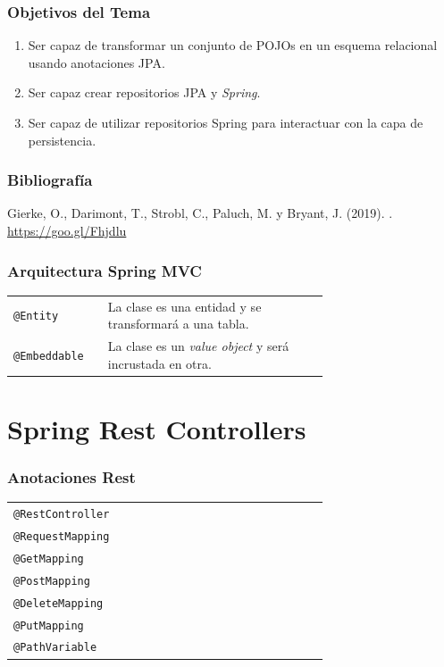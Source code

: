 \documentclass[handout,a4paper,slidestop,xcolor=pst,blue]{beamer}
\newcommand{\ann}[1]{\color{blue}\texttt{#1}\color{black}}
\begin{document}
\begin{frame}[c]
    \frametitle{Objetivos del Tema}
    \begin{enumerate}[<+->]
         \item Ser capaz de transformar un conjunto de POJOs en un esquema relacional usando anotaciones JPA.
         \item Ser capaz crear repositorios JPA y \emph{Spring}.
         \item Ser capaz de utilizar repositorios Spring para interactuar con la capa de persistencia.
    \end{enumerate}
\end{frame}

\begin{frame}[c]
    \frametitle{Bibliografía}
    \begin{thebibliography}{1}

        Gierke, O., Darimont, T., Strobl, C., Paluch, M. y Bryant, J. (2019).
        .
        \url{https://goo.gl/Fhjdlu}

    \end{thebibliography}
\end{frame}

\begin{frame}[c]
    \frametitle{Arquitectura Spring MVC}
    \begin{tabular}{lp{0.70\linewidth}}
        \ann{@Entity}     & La clase es una entidad y se transformará a una tabla. \\
        \ann{@Embeddable} & La clase es un \emph{value object} y será incrustada en otra.
    \end{tabular}
\end{frame}

\section{Spring Rest Controllers}

\begin{frame}[c]
    \frametitle{Anotaciones Rest}
    \begin{tabular}{lp{0.70\linewidth}}
        \ann{@RestController} &  \\
        \ann{@RequestMapping} &  \\
        \ann{@GetMapping}     &  \\
        \ann{@PostMapping}    &  \\
        \ann{@DeleteMapping}  &  \\
        \ann{@PutMapping}     &  \\
        \ann{@PathVariable}     &  \\

    \end{tabular}
\end{frame}
\end{document}
